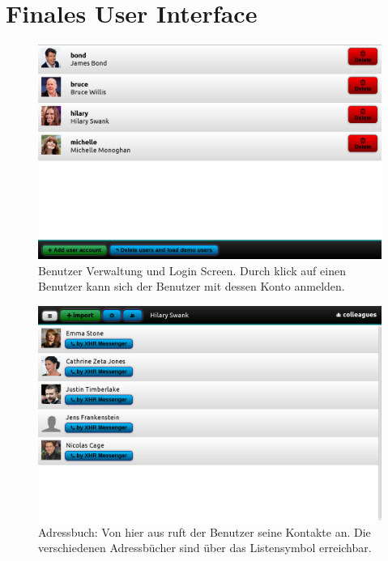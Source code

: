 \section{Finales User Interface}
	\begin{figure}[H]
		\centering
		\includegraphics[height=0.325\textheight]{../ui/img/finalUi/accountView.png}
		\caption[Account screen]{Benutzer Verwaltung und Login Screen. Durch klick auf einen Benutzer kann sich der Benutzer mit dessen Konto anmelden.\\
		}
		\label{login screen}
	\end{figure}
	\begin{figure}[H]
		\centering
		\includegraphics[height=0.325\textheight]{../ui/img/finalUi/contactView1.png}
		\caption[Contactbook screen]{Adressbuch: Von hier aus ruft der Benutzer seine Kontakte an. Die verschiedenen Adressbücher sind über das Listensymbol erreichbar.\\
		}
		\label{contactbook screen}
	\end{figure}
